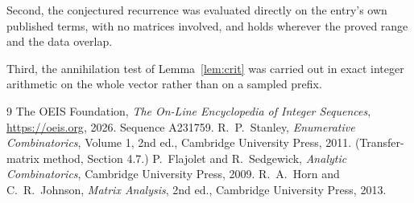 \documentclass[11pt,a4paper]{article}
\theoremstyle{plain}
\theoremstyle{definition}
\begin{document}
Second, the conjectured recurrence was evaluated directly on the entry's own published terms,
with no matrices involved, and holds wherever the proved range and the data overlap.

Third, the annihilation test of Lemma~\ref{lem:crit} was carried out in exact integer
arithmetic on the whole vector rather than on a sampled prefix.

\begin{thebibliography}{9}
 The OEIS Foundation, \emph{The On-Line Encyclopedia of Integer
Sequences}, \url{https://oeis.org}, 2026. Sequence A231759.
 R.~P.~Stanley, \emph{Enumerative Combinatorics}, Volume 1, 2nd ed.,
Cambridge University Press, 2011. (Transfer-matrix method, Section 4.7.)
 P.~Flajolet and R.~Sedgewick, \emph{Analytic Combinatorics}, Cambridge
University Press, 2009.
 R.~A.~Horn and C.~R.~Johnson, \emph{Matrix Analysis}, 2nd ed., Cambridge
University Press, 2013.
\end{thebibliography}
\end{document}
